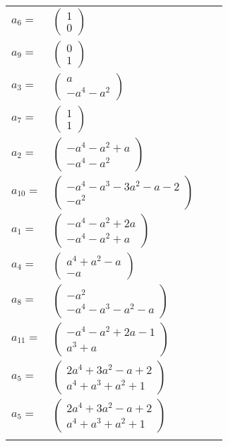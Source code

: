 \documentclass[1p]{elsarticle_modified}
\theoremstyle{definition}
\begin{document}
\begin{tabular}{m{7pt} m{180pt} m{7pt} m{180pt} }
\flushright $a_{6}=$&$\begin{pmatrix}1\\0\end{pmatrix}$ \\
\flushright $a_{9}=$&$\begin{pmatrix}0\\1\end{pmatrix}$ \\
\flushright $a_{3}=$&$\begin{pmatrix}a\\- a^4- a^2\end{pmatrix}$ \\
\flushright $a_{7}=$&$\begin{pmatrix}1\\1\end{pmatrix}$ \\
\flushright $a_{2}=$&$\begin{pmatrix}- a^4- a^2+a\\- a^4- a^2\end{pmatrix}$ \\
\flushright $a_{10}=$&$\begin{pmatrix}- a^4- a^3-3 a^2- a-2\\- a^2\end{pmatrix}$ \\
\flushright $a_{1}=$&$\begin{pmatrix}- a^4- a^2+2 a\\- a^4- a^2+a\end{pmatrix}$ \\
\flushright $a_{4}=$&$\begin{pmatrix}a^4+a^2- a\\- a\end{pmatrix}$ \\
\flushright $a_{8}=$&$\begin{pmatrix}- a^2\\- a^4- a^3- a^2- a\end{pmatrix}$ \\
\flushright $a_{11}=$&$\begin{pmatrix}- a^4- a^2+2 a-1\\a^3+a\end{pmatrix}$ \\
\flushright $a_{5}=$&$\begin{pmatrix}2 a^4+3 a^2- a+2\\a^4+a^3+a^2+1\end{pmatrix}$\\ \flushright $a_{5}=$&$\begin{pmatrix}2 a^4+3 a^2- a+2\\a^4+a^3+a^2+1\end{pmatrix}$\\&\end{tabular}
\end{document}
